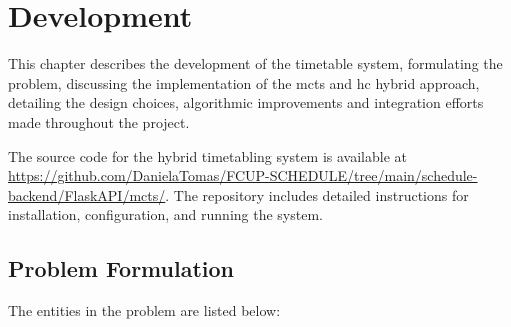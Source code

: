 
\chapter{Development}


\label{Development}

This chapter describes the development of the timetable system, formulating the problem, discussing the implementation of the \ac{mcts} and \ac{hc} hybrid approach, detailing the design choices, algorithmic improvements and integration efforts made throughout the project. 

The source code for the hybrid timetabling system is available at \url{https://github.com/DanielaTomas/FCUP-SCHEDULE/tree/main/schedule-backend/FlaskAPI/mcts/}. The repository includes detailed instructions for installation, configuration, and running the system.

\section{Problem Formulation}

The entities in the problem are listed below:

